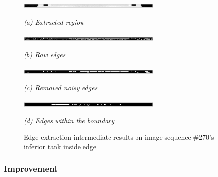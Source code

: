 \begin{figure}[htb]
  \begin{minipage}[b]{2.75in}
    \centering
    \centerline{\mbox{\includegraphics[width=2.75in]{data_extraction/images/sample/20121017_270/Coronal/inferior_inside/1_region.eps}}}
    \centerline{\emph{(a) Extracted region}}
  \end{minipage}\medskip
  \begin{minipage}[b]{2.75in}
    \centerline{\mbox{\includegraphics[width=2.75in]{data_extraction/images/sample/20121017_270/Coronal/inferior_inside/2_raw_edges.eps}}}
    \centerline{\emph{(b) Raw edges}}
  \end{minipage}
  \begin{minipage}[b]{2.75in}
    \centerline{\mbox{\includegraphics[width=2.75in]{data_extraction/images/sample/20121017_270/Coronal/inferior_inside/3_removed_noise.eps}}}
    \centerline{\emph{(c) Removed noisy edges}}
  \end{minipage}\medskip
  \begin{minipage}[b]{2.75in}
    \centerline{\mbox{\includegraphics[width=2.75in]{data_extraction/images/sample/20121017_270/Coronal/inferior_inside/4_within_boundary.eps}}}
    \centerline{\emph{(d) Edges within the boundary}}
  \end{minipage}
  \caption{Edge extraction intermediate results on image sequence \#270's inferior tank inside edge}
  \label{fig:coronal_270_intermediate_results}
\end{figure}

\subsubsection{Improvement}

